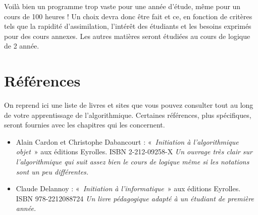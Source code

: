 	Voilà bien un programme trop vaste pour une année d’étude, même pour un
	cours de 100 heures ! Un choix devra donc être fait et ce, en fonction
	de critères tels que la rapidité d’assimilation, l’intérêt des
	étudiants et les besoins exprimés pour des cours annexes. Les autres
	matières seront étudiées au cours de logique de 2
	année.

\section{Références}
	
	On reprend ici une liste de livres et sites que vous pouvez consulter
	tout au long de votre apprentissage de
	l'algorithmique. Certaines références, plus
	spécifiques, seront fournies avec les chapitres qui les concernent.

	\begin{itemize}
	\item 
		Alain Cardon et Christophe Dabancourt : «~\textit{Initiation à
		l'algorithmique objet}~» aux éditions Eyrolles. ISBN
		2-212-09258-X
		\textit{Un ouvrage très clair sur l'algorithmique qui
		suit assez bien le cours de logique même si les notations sont un peu
		différentes.}
	\item
		Claude Delannoy : «~\textit{Initiation à
		l'informatique}~» aux éditions Eyrolles. 
		ISBN 978-2212088724
		\textit{Un livre pédagogique adapté à un étudiant de première année.}
	\end{itemize}
